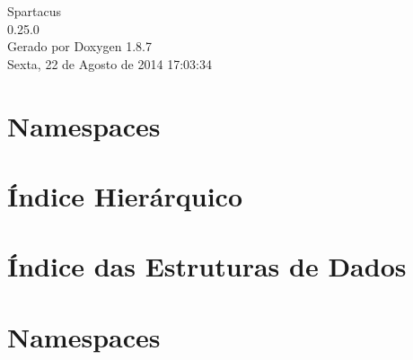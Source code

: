 \documentclass[twoside]{book}
\newcommand{\+}{\discretionary{\mbox{\scriptsize$\hookleftarrow$}}{}{}}
\newcommand{\clearemptydoublepage}{%
  \newpage{\pagestyle{empty}\cleardoublepage}%
}
\begin{document}
\hypersetup{pageanchor=false,
             bookmarks=true,
             bookmarksnumbered=true,
             pdfencoding=unicode
            }
\begin{titlepage}
\vspace*{7cm}
\begin{center}%
{\Large Spartacus \\[1ex]\large 0.\+25.\+0 }\\
\vspace*{1cm}
{\large Gerado por Doxygen 1.8.7}\\
\vspace*{0.5cm}
{\small Sexta, 22 de Agosto de 2014 17:03:34}\\
\end{center}
\end{titlepage}
\clearemptydoublepage
\tableofcontents
\clearemptydoublepage
{}
\hypersetup{pageanchor=true}

\chapter{Namespaces}

\chapter{Índice Hierárquico}

\chapter{Índice das Estruturas de Dados}

\chapter{Namespaces}






\end{document}

